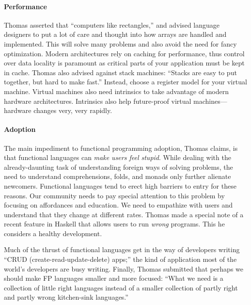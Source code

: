 \documentclass{jfp1}
\begin{document}
\paragraph{Performance} Thomas asserted that ``computers like
rectangles,'' and advised language designers to put a lot of care and
thought into how arrays are handled and implemented. This will solve
many problems and also avoid the need for fancy optimization. Modern
architectures rely on caching for performance, thus control over data
locality is paramount as critical parts of your application must be
kept in cache. Thomas also advised against stack machines: ``Stacks
are easy to put together, but hard to make fast.'' Instead, choose
a register model for your virtual machine. Virtual machines also
need intrinsics to take advantage of modern hardware architectures.
Intrinsics also help future-proof virtual machines---hardware changes
very, very rapidly.


\paragraph{Adoption} The main impediment to functional programming
adoption, Thomas claims, is that functional languages can \textit{make
users feel stupid}. While dealing with the already-daunting task of
understanding foreign ways of solving problems, the need to understand
comprehensions, folds, and monads only further alienate newcomers.
Functional languages tend to erect high barriers to entry for these
reasons. Our community needs to pay special attention to this problem
by focusing on affordances and education. We need to empathize with
users and understand that they change at different rates. Thomas made
a special note of a recent feature in Haskell that allows users to run
\textit{wrong} programs. This he considers a healthy development.

Much of the thrust of functional languages get in the way of
developers writing ``CRUD (create-read-update-delete) apps;'' the kind
of application most of the world's developers are busy writing. Finally, Thomas
submitted that perhaps we should make FP languages smaller and more
focused: ``What we need is a collection of little right languages
instead of a smaller collection of partly right and partly wrong
kitchen-sink languages.''
\end{document}
